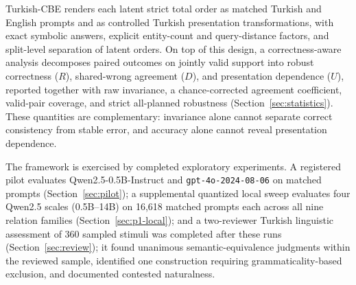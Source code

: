 Turkish-CBE renders each latent strict total order as matched Turkish and English prompts and as controlled
Turkish presentation transformations, with exact symbolic answers, explicit entity-count and query-distance
factors, and split-level separation of latent orders. On top of this design, a correctness-aware analysis
decomposes paired outcomes on jointly valid support into robust correctness ($R$), shared-wrong agreement
($D$), and presentation dependence ($U$), reported together with raw invariance, a chance-corrected
agreement coefficient, valid-pair coverage, and strict all-planned robustness
(Section~\ref{sec:statistics}). These quantities are complementary: invariance alone cannot separate
correct consistency from stable error, and accuracy alone cannot reveal presentation dependence.

The framework is exercised by completed exploratory experiments. A registered pilot evaluates
Qwen2.5-0.5B-Instruct and \texttt{gpt-4o-2024-08-06} on matched prompts (Section~\ref{sec:pilot}); a
supplemental quantized local sweep evaluates four Qwen2.5 scales (0.5B--14B) on 16,618 matched prompts each
across all nine relation families (Section~\ref{sec:p1-local}); and a two-reviewer Turkish linguistic
assessment of 360 sampled stimuli was completed after these runs (Section~\ref{sec:review}); it found
unanimous semantic-equivalence judgments within the reviewed sample, identified one construction requiring
grammaticality-based exclusion, and documented contested naturalness.

